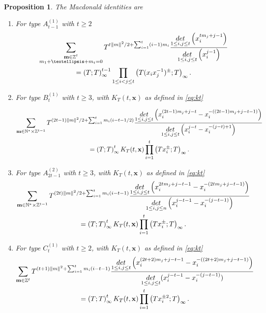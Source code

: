 \documentclass[10pt,a4paper]{amsart}
\newtheorem{prop}{Proposition}
\def\bbbz{\mathbb Z}
\def\det{{\rm det}}
\begin{document}
\begin{prop}\label{prop:intermed_rewrite}
The Macdonald identities are
\begin{enumerate}
\item For type $A^{(1)}_{t-1}$ with $t\geq 2$
\begin{multline}\label{eq:macdoAfin}
\sum_{\substack{\mathbf{m}\in\bbbz^t\\m_1+\dots+m_t=0}}T^{t\lVert m\rVert^2/2+\sum_{i=1}^t(i-1)m_i}\frac{\underset{1\le i,j\le t}{\det}\left(x_i^{tm_j+j-1}\right)}{\underset{1\le i,j\le t}{\det}\left(x_i^{j-1}\right)} \\
=\left(T;T\right)_\infty^{t-1} \prod_{1\le i<j\le t}\left(T(x_ix_j^{-1})^{\pm};T\right)_\infty.
\end{multline}
\item For type $B^{(1)}_{t}$ with $t\geq 3$, with $K_T(t,\mathbf{x})$ as defined in \eqref{eq:kt}

\begin{multline}
\sum_{\mathbf{m}\in\mathbb{N}^*\times\bbbz^{t-1}}T^{(2t-1)\lVert m\rVert^2/2+\sum_{i=1}^tm_i(i-t-1/2)}\frac{\underset{1\le i,j\le t}{\det}\left(x_i^{(2t-1)m_j+j-t}-x_i^{-((2t-1)m_j+j-t-1)}\right)}{\underset{1\le i,j\le t}{\det}\left(x_i^{j-t}-x_i^{-(j-t)+1}\right)}\\
=\left(T;T\right)_\infty^{t} K_T(t,\mathbf{x})\prod_{i=1}^t \left(Tx_i^{\pm};T\right)_\infty .\label{eq:misignbterm}
\end{multline}

\item For type $A^{(2)}_{2t-1}$ with $t\geq 3$, with $K_T(t,\mathbf{x})$ as defined in \eqref{eq:kt}
\begin{multline}
\sum_{\mathbf{m}\in\mathbb{N}^*\times\bbbz^{t-1}}T^{(2t)\lVert m\rVert^2/2+\sum_{i=1}^tm_i(i-t-1)}\frac{\underset{1\le i,j\le t}{\det}\left(x_i^{2tm_j+j-t-1}-x_i^{-(2tm_j+j-t-1)}\right)}{\underset{1\le i,j\le n}{\det}\left(x_i^{j-t-1}-x_i^{-(j-t-1)}\right)}\\
=\left(T;T\right)_\infty^{t} K_T(t,\mathbf{x})\prod_{i=1}^t \left(Tx_i^{\pm};T\right)_\infty .\label{eq:misignbvterm}
\end{multline}

\item For type $C^{(1)}_{t}$ with $t\geq 2$,  with $K_T(t,\mathbf{x})$ as defined in \eqref{eq:kt}
\begin{multline}
\sum_{\mathbf{m}\in\bbbz^t}T^{(t+1)\lVert m\rVert^2+\sum_{i=1}^tm_i(i-t-1)}\frac{\underset{1\le i,j\le t}{\det}\left(x_i^{(2t+2)m_j+j-t-1}-x_i^{-((2t+2)m_j+j-t-1)}\right)}{\underset{1\le i,j\le t}{\det}(x_i^{j-t-1}-x_i^{-(j-t-1)})}\\
=\left(T;T\right)_\infty^t K_T(t,{\bf x})\prod_{i=1}^t \left(Tx_i^{\pm2};T\right)_\infty .\label{eq:misign}
\end{multline}


\end{enumerate}
\end{prop}
\end{document}
